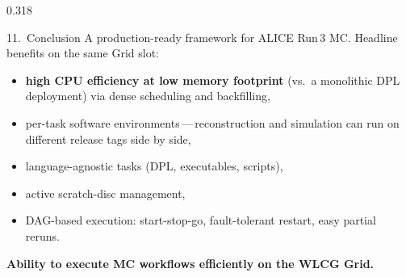 \documentclass[final,t]{beamer}
\begin{document}
\begin{frame}[t,fragile]
\begin{columns}[t,onlytextwidth]
\begin{column}{0.318\textwidth}
\vspace{8mm}

\begin{resultblock}{11.~Conclusion}
A production-ready framework for ALICE Run\,3 MC. Headline benefits
on the same Grid slot:
\begin{itemize}\setlength\itemsep{1mm}
  \item \textbf{high CPU efficiency at low memory footprint}
        (vs.\ a monolithic DPL deployment) via dense scheduling
        and backfilling,
  \item per-task software environments\,---\,reconstruction and
        simulation can run on different release tags side by side,
  \item language-agnostic tasks (DPL, executables, scripts),
  \item active scratch-disc management,
  \item DAG-based execution: start-stop-go, fault-tolerant restart,
        easy partial reruns.
\end{itemize}

\vspace{4mm}
\noindent\colorbox{alicered}{%
  \parbox{\dimexpr\linewidth-2\fboxsep\relax}{\centering
    \color{white}\bfseries\Large
    Ability to execute MC workflows efficiently on the WLCG
    Grid.\strut
  }%
}
\end{resultblock}

\end{column}
\end{columns}

\end{frame}
\end{document}
